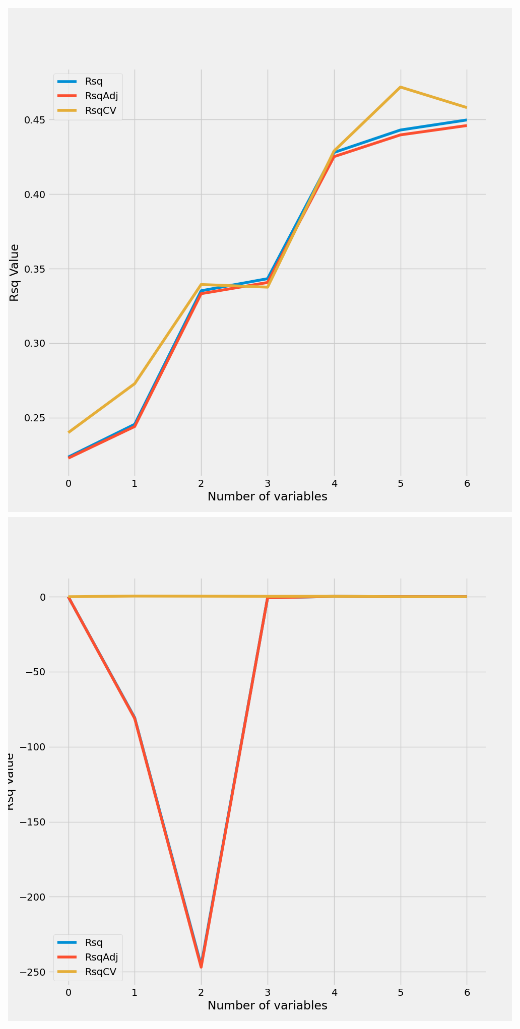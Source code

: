 \documentclass{article}
\begin{document}
	\includegraphics[scale = 0.2]{../plots/python/ConcreteForward4L.png} 
	\includegraphics[scale = 0.2]{../plots/python/ConcreteBackward4L.png}
\end{document}
